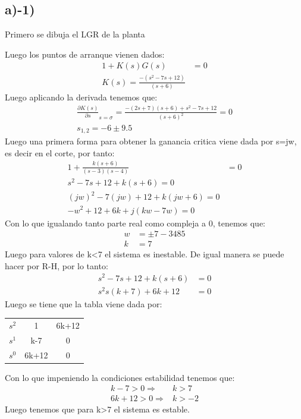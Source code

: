 \documentclass[
  11pt,
  letterpaper,
   addpoints,
   answers
  ]{exam}
\begin{document}
\begin{questions}
\begin{solution}
\subsection*{a)-1)}
Primero se dibuja el LGR de la planta

Luego los puntos de arranque vienen dados:
\begin{align}
    1+K(s)G(s) &= 0\\
    K(s) = \frac{-(s^{2}-7s+12)}{(s+6)}
\end{align}
Luego aplicando la derivada tenemos que:
\begin{align}
    \frac{\partial K(s)}{\partial s}_{s=\sigma} = \frac{-(2s+7)(s+6)+s^{2}-7s+12}{(s+6)^{2}}=0\\
    s_{1,2} = -6 \pm 9.5
\end{align}
Luego una primera forma para obtener la ganancia critica viene dada por s=jw, es decir en el corte, por tanto:
\begin{align}
    1+ \frac{k(s+6)}{(s-3)(s-4)}&=0\\
    s^{2}-7s +12 +k(s+6)=0\\
    (jw)^{2} -7(jw) + 12 + k(jw+6) =0\\
    -w^{2} +12 +6k + j(kw-7w) =0
\end{align}
Con lo que igualando tanto parte real como compleja a 0, tenemos que:
\begin{align}
    w &= \pm 7-3485\\
    k &= 7
\end{align}
Luego para valores de k<7 el sistema es inestable. De igual manera se puede hacer por R-H, por lo tanto:
\begin{align}
    s^{2} -7s +12 + k(s+6) &=0\\
    s^{2} s(k+7) +6k+12 &= 0
\end{align} 
Luego se tiene que la tabla viene dada por:
\begin{center}
    \begin{tabular}{|c|cc|}
        \hline
        $s^{2}$ & 1 & 6k+12\\
        $s^{1}$ & k-7 & 0\\
        $s^{0}$ & 6k+12 & 0\\
        \hline
    \end{tabular}
\end{center}
Con lo que impeniendo la condiciones estabilidad tenemos que:
\begin{align}
    k-7 > 0    \Rightarrow& k>7 \\
    6k+12 > 0  \Rightarrow& k>-2
\end{align}
Luego tenemos que para k>7 el sistema es estable.

\end{solution}
\end{questions}
\end{document}
